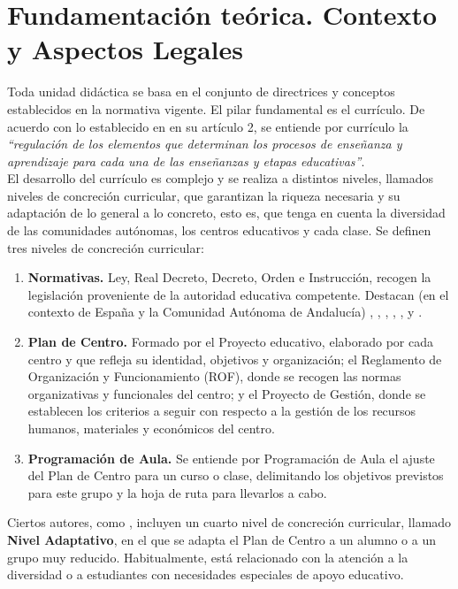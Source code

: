 \documentclass[../main.tex]{book}
\begin{document}
\chapter{Fundamentación teórica. Contexto y Aspectos Legales}
\label{sec:fund-teorica}

Toda unidad didáctica se basa en el conjunto de directrices y conceptos establecidos en la normativa vigente. El pilar fundamental es el currículo. De acuerdo con lo establecido en \cite{RD1105} en su artículo 2, se entiende por currículo la \textit{``regulación de los elementos que determinan los procesos de enseñanza y aprendizaje para cada una de las enseñanzas y etapas educativas''}. \\

El desarrollo del currículo es complejo y se realiza a distintos niveles, llamados niveles de concreción curricular, que garantizan la riqueza necesaria y su adaptación de lo general a lo concreto, esto es, que tenga  en cuenta la diversidad  de las comunidades autónomas, los centros educativos y cada clase. Se definen tres niveles de concreción curricular:

\begin{enumerate}
	\item \textbf{Normativas.} Ley, Real Decreto, Decreto, Orden e Instrucción, recogen la legislación proveniente de la autoridad educativa competente. Destacan (en el contexto de España y la Comunidad Autónoma de Andalucía) 
	\cite{organica32020}, \cite{RD1105}, \cite{decreto182}, \cite{decreto110}, \cite{orden1512021}, \cite{ecd652015} y \cite{instruccion92020}.
	

	
	\item \textbf{Plan de Centro.} Formado por el Proyecto educativo, elaborado por cada centro y que refleja su identidad, objetivos y organización; el Reglamento de Organización y Funcionamiento (ROF), donde se recogen las normas organizativas y funcionales del centro; y el Proyecto de Gestión, donde se establecen los criterios a seguir con respecto a la gestión de los recursos humanos, materiales y económicos del centro.
	
	\item \textbf{Programación de Aula.} Se entiende por Programación de Aula el ajuste del Plan de Centro para un curso o clase, delimitando los objetivos previstos para este grupo y la hoja de ruta para llevarlos a cabo.
\end{enumerate}

Ciertos autores, como \cite{cabrerizo2007}, incluyen un cuarto nivel de concreción curricular, llamado \textbf{Nivel Adaptativo}, en el que se adapta el Plan de Centro a un alumno o a un grupo muy reducido. Habitualmente, está relacionado con la atención a la diversidad o a estudiantes con necesidades especiales de apoyo educativo. \\
\end{document}
